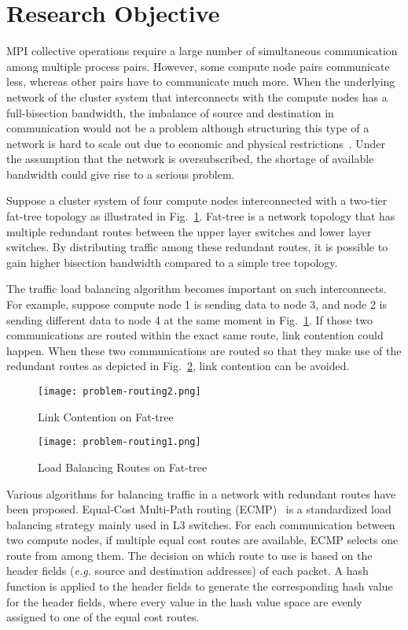 \section{Research Objective}\label{sec:iii-background}

MPI collective operations require a large number of simultaneous communication
among multiple process pairs. However, some compute node pairs communicate
less, whereas other pairs have to communicate much more. When the underlying
network of the cluster system that interconnects with the compute nodes has a
full-bisection bandwidth, the imbalance of source and destination in
communication would not be a problem although structuring this type of a
network is hard to scale out due to economic and physical
restrictions~\autocite{Al-Fares2008}. Under the assumption that the network is
oversubscribed, the shortage of available bandwidth could give rise to a
serious problem.

Suppose a cluster system of four compute nodes interconnected with a
two-tier fat-tree topology as illustrated in Fig.~\ref{fig:problem-routing1}.
Fat-tree is a network topology that has multiple redundant routes between the
upper layer switches and lower layer switches. By distributing traffic among
these redundant routes, it is possible to gain higher bisection bandwidth
compared to a simple tree topology.

The traffic load balancing algorithm becomes important on such interconnects.
For example, suppose compute node 1 is sending data to node 3, and node 2 is
sending different data to node 4 at the same moment in
Fig.~\ref{fig:problem-routing1}. If those two communications are routed within
the exact same route, link contention could happen. When these two
communications are routed so that they make use of the redundant routes as
depicted in Fig.~\ref{fig:problem-routing2}, link contention can be avoided.

\begin{figure}
    \centering
    \texttt{[image: problem-routing2.png]}
    \caption{Link Contention on Fat-tree}%
    \label{fig:problem-routing1}
\end{figure}

\begin{figure}
    \centering
    \texttt{[image: problem-routing1.png]}
    \caption{Load Balancing Routes on Fat-tree}%
    \label{fig:problem-routing2}
\end{figure}

Various algorithms for balancing traffic in a network with redundant
routes have been proposed. Equal-Cost Multi-Path routing (ECMP)~\autocite{ecmp} is
a standardized load balancing strategy mainly used in L3 switches. For each
communication between two compute nodes, if multiple equal cost routes are
available, ECMP selects one route from among them. The decision on which route
to use is based on the header fields (\emph{e.g.} source and destination
addresses) of each packet. A hash function is applied to the header fields to
generate the corresponding hash value for the header fields, where every value
in the hash value space are evenly assigned to one of the equal cost routes.

